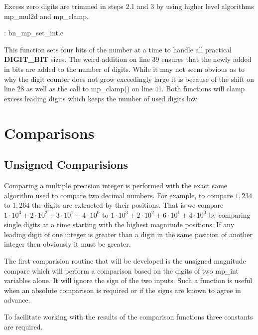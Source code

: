 \documentclass[b5paper]{book}
\begin{document}
Excess zero digits are trimmed in steps 2.1 and 3 by using higher level algorithms mp\_mul2d and mp\_clamp.

\vspace{+3mm}\begin{small}
\hspace{-5.1mm}{\bf File}: bn\_mp\_set\_int.c
\vspace{-3mm}
\begin{alltt}
\end{alltt}
\end{small}

This function sets four bits of the number at a time to handle all practical \textbf{DIGIT\_BIT} sizes.  The weird
addition on line 39 ensures that the newly added in bits are added to the number of digits.  While it may not 
seem obvious as to why the digit counter does not grow exceedingly large it is because of the shift on line 28 
as well as the  call to mp\_clamp() on line 41.  Both functions will clamp excess leading digits which keeps 
the number of used digits low.

\section{Comparisons}
\subsection{Unsigned Comparisions}
Comparing a multiple precision integer is performed with the exact same algorithm used to compare two decimal numbers.  For example,
to compare $1,234$ to $1,264$ the digits are extracted by their positions.  That is we compare $1 \cdot 10^3 + 2 \cdot 10^2 + 3 \cdot 10^1 + 4 \cdot 10^0$
to $1 \cdot 10^3 + 2 \cdot 10^2 + 6 \cdot 10^1 + 4 \cdot 10^0$ by comparing single digits at a time starting with the highest magnitude 
positions.  If any leading digit of one integer is greater than a digit in the same position of another integer then obviously it must be greater.  

The first comparision routine that will be developed is the unsigned magnitude compare which will perform a comparison based on the digits of two
mp\_int variables alone.  It will ignore the sign of the two inputs.  Such a function is useful when an absolute comparison is required or if the 
signs are known to agree in advance.

To facilitate working with the results of the comparison functions three constants are required.  
\end{document}
